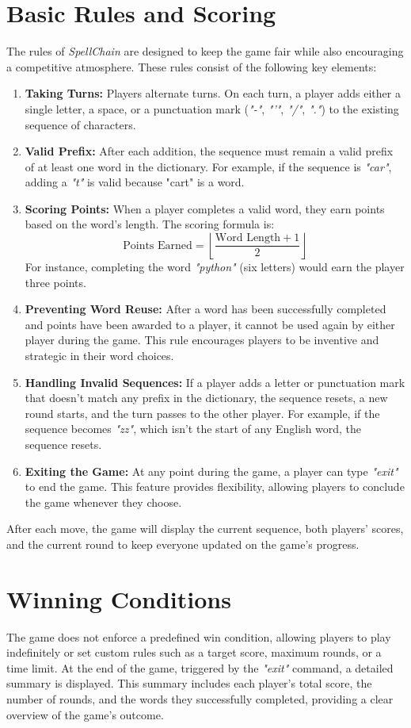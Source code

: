 \documentclass{article}
\begin{document}
\section*{Basic Rules and Scoring}
The rules of \textit{SpellChain} are designed to keep the game fair while also encouraging a competitive atmosphere. These rules consist of the following key elements:
\begin{enumerate}
    \item \textbf{Taking Turns:} Players alternate turns. On each turn, a player adds either a single letter, a space, or a punctuation mark (\textit{"-"}, \textit{"'"}, \textit{"/"}, \textit{"."}) to the existing sequence of characters.
    \item \textbf{Valid Prefix:} After each addition, the sequence must remain a valid prefix of at least one word in the dictionary. For example, if the sequence is \textit{"car"}, adding a \textit{"t"} is valid because "cart" is a word.
    \item \textbf{Scoring Points:} When a player completes a valid word, they earn points based on the word's length. The scoring formula is:
    \[
        \text{Points Earned} = \left\lfloor \frac{\text{Word Length} + 1}{2} \right\rfloor
    \]
    For instance, completing the word \textit{"python"} (six letters) would earn the player three points.
    \item \textbf{Preventing Word Reuse:} After a word has been successfully completed and points have been awarded to a player, it cannot be used again by either player during the game. This rule encourages players to be inventive and strategic in their word choices.
    \item \textbf{Handling Invalid Sequences:} If a player adds a letter or punctuation mark that doesn't match any prefix in the dictionary, the sequence resets, a new round starts, and the turn passes to the other player. For example, if the sequence becomes \textit{"zz"}, which isn't the start of any English word, the sequence resets.
    \item \textbf{Exiting the Game:} At any point during the game, a player can type \textit{"exit"} to end the game. This feature provides flexibility, allowing players to conclude the game whenever they choose.
\end{enumerate}
After each move, the game will display the current sequence, both players' scores, and the current round to keep everyone updated on the game's progress.

\section*{Winning Conditions}
The game does not enforce a predefined win condition, allowing players to play indefinitely or set custom rules such as a target score, maximum rounds, or a time limit. At the end of the game, triggered by the \textit{"exit"} command, a detailed summary is displayed. This summary includes each player's total score, the number of rounds, and the words they successfully completed, providing a clear overview of the game's outcome.
\end{document}
